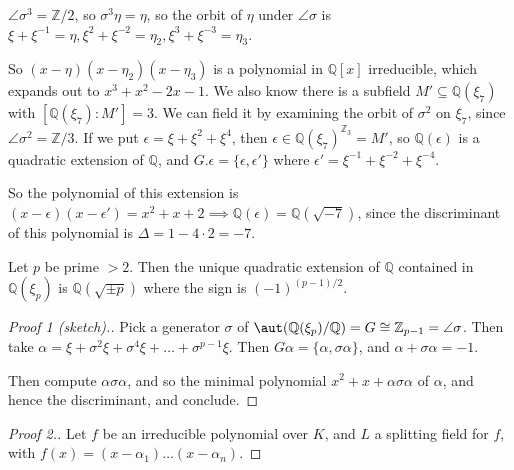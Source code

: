 \documentclass[a4paper, 10pt, twocolumn]{amsart}
\begin{document}
\begin{enumerate}
\begin{enumerate}
$\angle{\sigma^3} = \mathbb{Z}/2$, so $\sigma^3\eta = \eta$, so the orbit of $\eta$ under $\angle{\sigma}$ is $\xi+\xi^{-1} = \eta, \xi^2 + \xi^{-2} = \eta_2, \xi^3+\xi^{-3} = \eta_3$.

So $(x-\eta)(x-\eta_2)(x-\eta_3)$ is a polynomial in $\mathbb{Q}[x]$ irreducible, which expands out to $x^3+x^2-2x-1$. We also know there is a subfield $M'\subseteq \mathbb{Q}(\xi_7)$ with $[\mathbb{Q}(\xi_7):M'] = 3$. We can field it by examining the orbit of $\sigma^2$ on $\xi_7$, since $\angle{\sigma^2} = \mathbb{Z}/3$. If we put $\epsilon = \xi + \xi^2 + \xi^4$, then $\epsilon \in \mathbb{Q}(\xi_7)^{\mathbb{Z}_3} = M'$, so $\mathbb{Q}(\epsilon)$ is a quadratic extension of $\mathbb{Q}$, and $G.\epsilon = \{\epsilon, \epsilon'\}$ where $\epsilon' = \xi^{-1} + \xi^{-2} + \xi^{-4}$.

So the polynomial of this extension is $(x-\epsilon)(x-\epsilon') = x^2+x+2 \implies \mathbb{Q}(\epsilon) = \mathbb{Q}(\sqrt{-7})$, since the discriminant of this polynomial is $\Delta = 1-4\cdot 2 = -7$.
\begin{proposition}
Let $p$ be prime $>2$. Then the unique quadratic extension of $\mathbb{Q}$ contained in $\mathbb{Q}(\xi_p)$ is $\mathbb{Q}(\sqrt{\pm p})$ where the sign is $(-1)^{(p-1)/2}$.
\end{proposition}
\begin{proof}[Proof 1 (sketch).]
Pick a generator $\sigma$ of $\aut(\mathbb{Q}(\xi_p)/\mathbb{Q}) = G \cong \mathbb{Z}_{p-1} = \angle{\sigma}$. Then take $\alpha = \xi + \sigma^2 \xi + \sigma^4 \xi + \ldots + \sigma^{p-1} \xi$. Then $G\alpha = \{\alpha, \sigma\alpha\}$, and $\alpha+\sigma\alpha = -1$.

Then compute $\alpha\sigma\alpha$, and so the minimal polynomial $x^2 + x + \alpha\sigma\alpha$ of $\alpha$, and hence the discriminant, and conclude.
\end{proof}
\begin{proof}[Proof 2.]
Let $f$ be an irreducible polynomial over $K$, and $L$ a splitting field for $f$, with $f(x) = (x-\alpha_1)\ldots(x-\alpha_n)$.


\end{proof}
\end{enumerate}
\end{enumerate}
\end{document}
